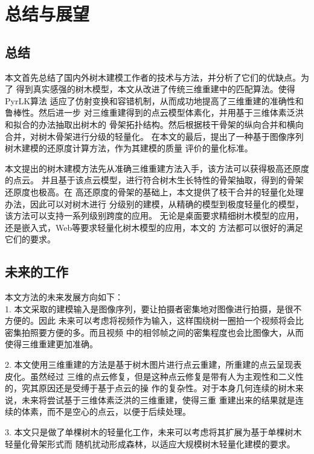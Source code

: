 
\chapter{总结与展望}

\section{总结}
本文首先总结了国内外树木建模工作者的技术与方法，并分析了它们的优缺点。为了
得到真实感强的树木模型，本文从改进了传统三维重建中的匹配算法。使得PyrLK算法
适应了仿射变换和容错机制，从而成功地提高了三维重建的准确性和鲁棒性。然后进一步
对三维重建得到的点云模型体素化，并用基于三维体素泛洪和拟合的办法抽取出树木的
骨架拓扑结构。然后根据枝干骨架的纵向合并和横向合并，对树木骨架进行分级的轻量化。
在本文的最后，提出了一种基于图像序列树木建模的还原度计算方法，作为其建模的质量
评价的量化标准。

本文提出的树木建模方法先从准确三维重建方法入手，该方法可以获得极高还原度的点云。
并且基于该点云模型，进行符合树木生长特性的骨架抽取，得到的骨架还原度也极高。在
高还原度的骨架的基础上，本文提供了枝干合并的轻量化处理办法，因此可以对树木进行
分级别的建模，从精确的模型到极度轻量化的模型，该方法可以支持一系列级别跨度的应用。
无论是桌面要求精细树木模型的应用，还是嵌入式，Web等要求轻量化树木模型的应用，本文的
方法都可以很好的满足它们的要求。

\section{未来的工作}
本文方法的未来发展方向如下：\\

1. 本文采取的建模输入是图像序列，要让拍摄者密集地对图像进行拍摄，是很不方便的。因此
未来可以考虑将视频作为输入，这样围绕树一圈拍一个视频将会比密集拍照要方便的多。而且视频
中的相邻帧之间的密集程度也会比图像大，从而使得三维重建更加准确。

2. 本文使用三维重建的方法是基于树木图片进行点云重建，所重建的点云呈现表皮化。虽然经过
三维的点云修复，但是这种点云修复是带有人为主观性和二义性的，究其原因还是受缚于基于点云的操
作的复杂性。对于本身几何连续的树木来说，未来将尝试基于三维体素泛洪的三维重建，使得三重
重建出来的结果就是连续的体素，而不是空心的点云，以便于后续处理。

3. 本文只是做了单棵树木的轻量化工作，未来可以考虑将其扩展为基于单棵树木轻量化骨架形式而
随机扰动形成森林，以适应大规模树木轻量化建模的要求。
